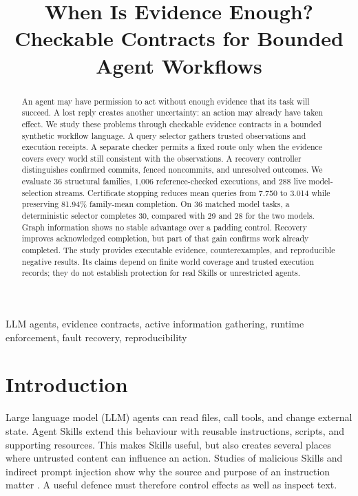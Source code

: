 \documentclass[conference]{IEEEtran}
\title{When Is Evidence Enough?\\Checkable Contracts for Bounded Agent Workflows}
\author{\IEEEauthorblockN{Victor Cao}
\IEEEauthorblockA{University of Auckland\\Auckland, New Zealand\\xcao541@aucklanduni.ac.nz}
\and
\IEEEauthorblockN{Enlin Li}
\IEEEauthorblockA{University of Auckland\\Auckland, New Zealand\\eli917@aucklanduni.ac.nz}}
\begin{document}
\maketitle
\thispagestyle{plain}
\begin{abstract}
An agent may have permission to act without enough evidence that its task will succeed. A lost reply creates another uncertainty: an action may already have taken effect. We study these problems through checkable evidence contracts in a bounded synthetic workflow language. A query selector gathers trusted observations and execution receipts. A separate checker permits a fixed route only when the evidence covers every world still consistent with the observations. A recovery controller distinguishes confirmed commits, fenced noncommits, and unresolved outcomes. We evaluate 36 structural families, 1,006 reference-checked executions, and 288 live model-selection streams. Certificate stopping reduces mean queries from 7.750 to 3.014 while preserving 81.94\% family-mean completion. On 36 matched model tasks, a deterministic selector completes 30, compared with 29 and 28 for the two models. Graph information shows no stable advantage over a padding control. Recovery improves acknowledged completion, but part of that gain confirms work already completed. The study provides executable evidence, counterexamples, and reproducible negative results. Its claims depend on finite world coverage and trusted execution records; they do not establish protection for real Skills or unrestricted agents.
\end{abstract}
\begin{IEEEkeywords}
LLM agents, evidence contracts, active information gathering, runtime enforcement, fault recovery, reproducibility
\end{IEEEkeywords}

\section{Introduction}
\label{sec:intro}
Large language model (LLM) agents can read files, call tools, and change external state. Agent Skills extend this behaviour with reusable instructions, scripts, and supporting resources. This makes Skills useful, but also creates several places where untrusted content can influence an action. Studies of malicious Skills and indirect prompt injection show why the source and purpose of an instruction matter \cite{liu,skillinject,injecagent}. A useful defence must therefore control effects as well as inspect text.
\end{document}
